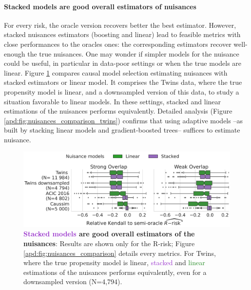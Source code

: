 \documentclass[11pt]{article}
\begin{document}
\paragraph{Stacked models are good overall estimators of nuisances}

For every risk, the oracle version recovers better the best estimator.
However,
stacked nuisances estimators (boosting and linear) lead to feasible
metrics with close performances to the oracles ones: the
corresponding estimators recover well-enough the true nuisances.
One may wonder if simpler models for the nuisance could be useful,
in particular in data-poor settings or when the true models are linear.
Figure \ref{fig:all_datasets_nuisances_comparison} compares causal model
selection estimating nuisances with stacked estimators or linear model.
It comprises the Twins data, where the true propensity model is linear,
and a downsampled version of this data, to study a situation favorable to
linear models. In these settings,
stacked and linear estimations of the nuisances performs equivalently.
Detailed analysis (Figure \ref{apd:fig:nuisances_comparison_twins})
confirms that using adaptive models --as built by
stacking linear models and gradient-boosted trees-- suffices to estimate nuisance.

\begin{figure}[!tb]
    \centering\begin{minipage}{.75\linewidth}
    \includegraphics[width=\linewidth]{images/_4_nuisance_models_r_risk_only_3datasets_twocols.pdf}
    \end{minipage}

    \caption{\textbf{\textcolor{DarkOrchid}{Stacked
                models} are good overall estimators of the nuisances}:
        Results are shown only for the
        R-risk; Figure \ref{apd:fig:nuisances_comparison}
        details every metrics. For Twins, where the true propensity
        model is linear, \textcolor{DarkOrchid}{stacked} and
        \textcolor{ForestGreen}{linear}
        estimations of the nuisances performs equivalently, even for a downsampled version
        (N=4,794). }\label{fig:all_datasets_nuisances_comparison}
\end{figure}
\end{document}
